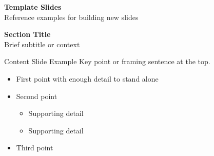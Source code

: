 
\begin{frame}[plain]
  \vfill
  \begin{center}
    {\LARGE\color{slate900}\textbf{Template Slides}}\\[8pt]
    {\color{slate700}Reference examples for building new slides}
  \end{center}
  \vfill
\end{frame}

\begin{frame}[plain]
  \vfill
  \begin{center}
    {\LARGE\color{slate900}\textbf{Section Title}}\\[8pt]
    {\color{slate700}Brief subtitle or context}
  \end{center}
  \vfill
\end{frame}

\begin{frame}{Content Slide Example}
  Key point or framing sentence at the top.

  \begin{itemize}
    \item First point with enough detail to stand alone
    \item Second point
      \begin{itemize}
        \item Supporting detail
        \item Supporting detail
      \end{itemize}
    \item Third point
  \end{itemize}
\end{frame}

